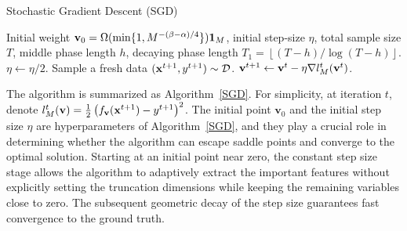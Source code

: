 


\begin{algorithm}[t]
	\caption{Stochastic Gradient Descent (SGD)}
    \label{SGD}
	\begin{algorithmic}
         Initial weight $\mathbf{v}_0=\Omega(\min\{1,M^{-(\beta-\alpha)/4}\})\mathbf{1}_M$, initial step-size $\eta$, total sample size $T$, middle phase length $h$, decaying phase length $T_1=\left\lfloor (T-h)/\log(T-h)\right\rfloor$.
		\STATE $\eta\leftarrow\eta/2$.
		\ENDIF
		\STATE Sample a fresh data   $(\mathbf{x}^{t+1},y^{t+1})\sim\mathcal{D}$.
		\STATE $\mathbf{v}^{t+1}\leftarrow\mathbf{v}^t-\eta\nabla l_M^t(\mathbf{v}^t)$.
		\ENDWHILE
	\end{algorithmic}
\end{algorithm}

The algorithm is summarized as Algorithm~\ref{SGD}. 
For simplicity,  at iteration $t$, denote $l^t_M(\mathbf{v})=\frac{1}{2}\left(f_{\mathbf{v}}(\mathbf{x}^{t+1})-y^{t+1}\right)^2$. 
The initial point $\mathbf{v}_0$ and the initial step size $\eta$ are hyperparameters of Algorithm~\ref{SGD}, and they play a crucial role in determining whether the algorithm can escape saddle points and converge to the optimal solution. 
Starting at an initial point near zero, the constant step size stage allows the algorithm to adaptively extract the important features without explicitly setting the truncation dimensions while keeping the remaining variables close to zero. The subsequent geometric decay of the step size guarantees fast convergence to the ground truth.  %

\iffalse
